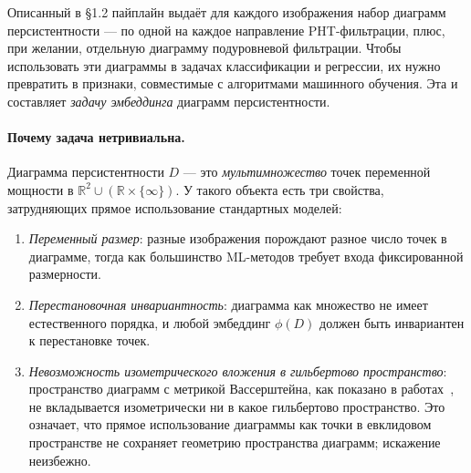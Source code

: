 \label{sec:embedding-task}
Описанный в §1.2 пайплайн выдаёт для каждого изображения набор диаграмм персистентности --- по одной на каждое направление PHT-фильтрации, плюс, при желании, отдельную диаграмму подуровневой фильтрации. Чтобы использовать эти диаграммы в задачах классификации и регрессии, их нужно превратить в признаки, совместимые с алгоритмами машинного обучения. Эта и составляет \emph{задачу эмбеддинга} диаграмм персистентности.

\paragraph{Почему задача нетривиальна.}
Диаграмма персистентности $D$ --- это \emph{мультимножество} точек переменной мощности в $\mathbb{R}^2 \cup (\mathbb{R} \times \{\infty\})$. У такого объекта есть три свойства, затрудняющих прямое использование стандартных моделей:
\begin{enumerate}
\item \emph{Переменный размер}: разные изображения порождают разное число точек в диаграмме, тогда как большинство ML-методов требует входа фиксированной размерности.
\item \emph{Перестановочная инвариантность}: диаграмма как множество не имеет естественного порядка, и любой эмбеддинг $\phi(D)$ должен быть инвариантен к перестановке точек.
\item \emph{Невозможность изометрического вложения в гильбертово пространство}: пространство диаграмм с метрикой Вассерштейна, как показано в работах~\cite{mileykoProbabilityMeasuresSpace2011}, не вкладывается изометрически ни в какое гильбертово пространство. Это означает, что прямое использование диаграммы как точки в евклидовом пространстве не сохраняет геометрию пространства диаграмм; искажение неизбежно.
\end{enumerate}

